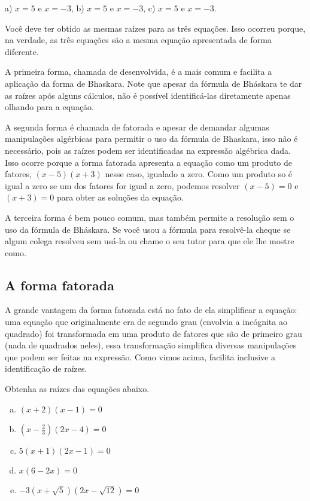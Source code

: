 \documentclass[main_estudante.tex]{subfiles}
\begin{document}
\begin{gabarito}
	\begin{gabaritoQuestao}
		a) $x=5$ e $x=-3$, b) $x=5$ e $x=-3$, c) $x=5$ e $x=-3$.
	\end{gabaritoQuestao}
\end{gabarito}

Você deve ter obtido as mesmas raízes para as três equações. Isso ocorreu porque, na verdade, as três equações são a mesma equação apresentada de forma diferente.

A primeira forma, chamada de desenvolvida, é a mais comum e facilita a aplicação da forma de Bhaskara. Note que apesar da fórmula de Bháskara te dar as raízes após alguns cálculos, não é possível identificá-las diretamente apenas olhando para a equação.

A segunda forma é chamada de fatorada e apesar de demandar algumas manipulações algérbicas para permitir o uso da fórmula de Bhaskara, isso não é necessário, pois as raízes podem ser identificadas na expressão algébrica dada. Isso ocorre porque a forma fatorada apresenta a equação como um produto de fatores, $(x-5)(x+3)$ nesse caso, igualado a zero. Como um produto so é igual a zero se um dos fatores for igual a zero, podemos resolver $(x-5)=0$ e $(x+3)=0$ para obter as soluções da equação.

A terceira forma é bem pouco comum, mas também permite a resolução sem o uso da fórmula de Bháskara. Se você usou a fórmula para resolvê-la cheque se algum colega resolveu sem usá-la ou chame o seu tutor para que ele lhe mostre como.

\subsection*{A forma fatorada}

A grande vantagem da forma fatorada está no fato de ela simplificar a equação: uma equação que originalmente era de segundo grau (envolvia a incógnita ao quadrado) foi transformada em uma produto de fatores que são de primeiro grau (nada de quadrados neles), essa transformação simplifica diversas manipulações que podem ser feitas na expressão. Como vimos acima, facilita inclusive a identificação de raízes.

\begin{questao}
Obtenha as raízes das equações abaixo.
\begin{enumerate}[a)]
\item $(x+2)(x-1)=0$
\item $(x-\frac{2}{3})(2x-4)=0$
\item $5(x+1)(2x-1)=0$
\item $x(6-2x)=0$
\item $-3(x+\sqrt{5})(2x-\sqrt{12})=0$
\end{enumerate}
\end{questao}
\end{document}
